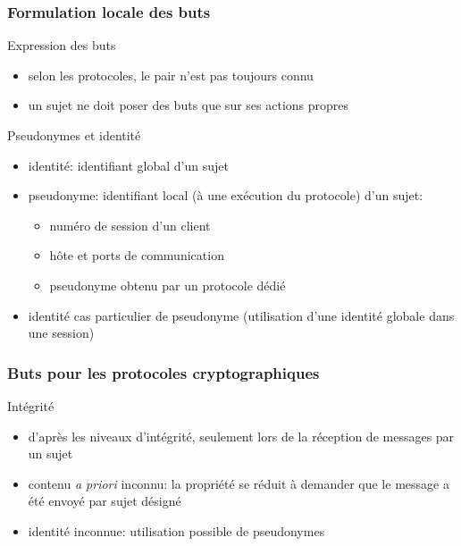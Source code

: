 \begin{reveals}
\begin{frame}
\end{frame}

\begin{frame}
  \frametitle{Formulation locale des buts}

  \vfill

   \begin{block}{Expression des buts}
     \begin{itemize}
     \item selon les protocoles, le pair n'est pas toujours connu
     \item un sujet ne doit poser des buts que sur ses actions propres
     \end{itemize}
  \end{block}

  \vfill

  \begin{block}{Pseudonymes et identité}
    \begin{itemize}
    \item identité: identifiant global d'un sujet
    \item pseudonyme: identifiant local (à une exécution du protocole) d'un sujet:
      \begin{itemize}
      \item numéro de session d'un client
      \item hôte et ports de communication
      \item pseudonyme obtenu par un protocole dédié
      \end{itemize}
    \item identité cas particulier de pseudonyme (utilisation d'une
      identité globale dans une session)
    \end{itemize}
  \end{block}

  \vfill

\end{frame}


\begin{frame}
  \frametitle{Buts pour les protocoles cryptographiques}

  \vfill

  \begin{block}{Intégrité}
    \begin{itemize}
    \item d'après les niveaux d'intégrité, seulement lors de la
      réception de messages par un sujet
    \item contenu \textit{a priori} inconnu: la propriété se réduit à
      demander que le message a été envoyé par sujet désigné
    \item identité inconnue: utilisation possible de pseudonymes
    \end{itemize}
  \end{block}


\end{frame}
\end{reveals}
